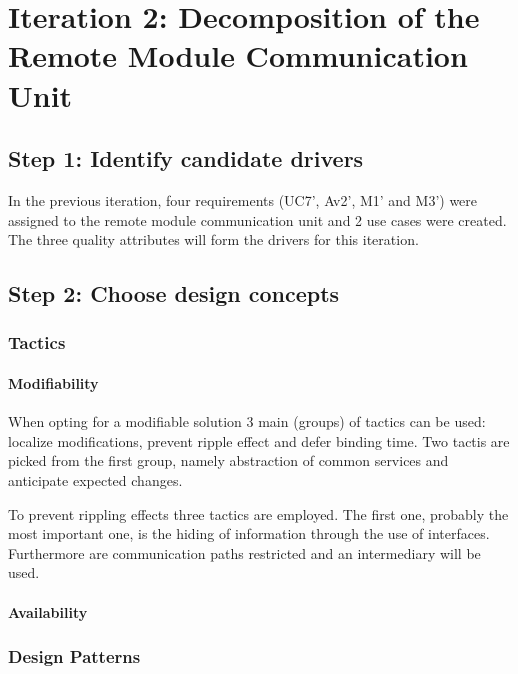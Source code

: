 \section{Iteration 2: Decomposition of the Remote Module Communication Unit}
\label{add:it2}

\subsection{Step 1: Identify candidate drivers}
\label{add:it2/drivers}

\npar In the previous iteration, four requirements (UC7', Av2', M1' and M3')
were assigned to the remote module communication unit and 2 use cases were
created. The three quality attributes will form the drivers for this iteration.

\subsection{Step 2: Choose design concepts}
\label{add:it2/concepts}

\subsubsection{Tactics}
\label{add:it2/tactics}

\paragraph{Modifiability}

\npar When opting for a modifiable solution 3 main (groups) of tactics can be
used: localize modifications, prevent ripple effect and defer binding time.
Two tactis are picked from the first group, namely abstraction of common
services and anticipate expected changes.

\npar To prevent rippling effects three tactics are employed. The first one,
probably the most important one, is the hiding of information through the use of
interfaces. Furthermore are communication paths restricted and an intermediary
will be used.

\paragraph{Availability}


\subsubsection{Design Patterns}
\label{add:it2/patterns}

